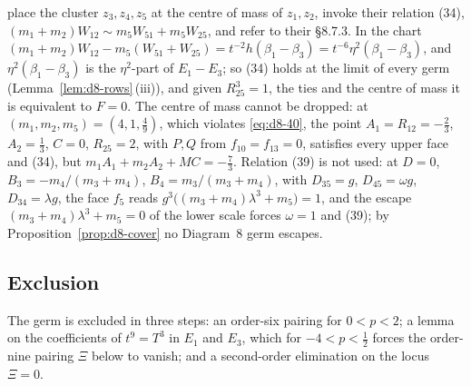 \begin{remark}\label{rem:d8-ak}
\cite[\S8.8]{AK} place the cluster $z_3,z_4,z_5$ at the centre of mass of $z_1,z_2$, invoke
their relation (34), $(m_1+m_2)W_{12}\sim m_5W_{51}+m_5W_{25}$, and refer to their \S8.7.3.  In
the chart $(m_1+m_2)W_{12}-m_5(W_{51}+W_{25})=t^{-2}h(\beta_1-\beta_3)=t^{-6}\eta^2
(\beta_1-\beta_3)$, and $\eta^2(\beta_1-\beta_3)$ is the $\eta^2$-part of $E_1-E_3$; so (34)
holds at the limit of every germ (Lemma~\ref{lem:d8-rows}\,(iii)), and given $R_{25}^3=1$, the
ties and the centre of mass it is equivalent to $F=0$.  The centre of mass cannot be dropped: at
$(m_1,m_2,m_5)=(4,1,\frac49)$, which violates \eqref{eq:d8-40}, the point
$A_1=R_{12}=-\frac23$, $A_2=\frac13$, $C=0$, $R_{25}=2$, with $P,Q$ from $f_{10}=f_{13}=0$,
satisfies every upper face and (34), but $m_1A_1+m_2A_2+MC=-\frac73$.  Relation (39) is not
used: at $D=0$, $B_3=-m_4/(m_3+m_4)$, $B_4=m_3/(m_3+m_4)$, with $D_{35}=g$, $D_{45}=\omega g$,
$D_{34}=\lambda g$, the face $f_5$ reads $g^3\bigl((m_3+m_4)\lambda^3+m_5\bigr)=1$, and the
escape $(m_3+m_4)\lambda^3+m_5=0$ of the lower scale forces $\omega=1$ and (39); by
Proposition~\ref{prop:d8-cover} no Diagram~8 germ escapes.
\end{remark}

\subsection{Exclusion}
The germ is excluded in three steps: an order-six pairing for $0<p<2$; a lemma on the
coefficients of $t^9=T^3$ in $E_1$ and $E_3$, which for $-4<p<\frac12$ forces the order-nine
pairing $\Xi$ below to vanish; and a second-order elimination on the locus $\Xi=0$.

